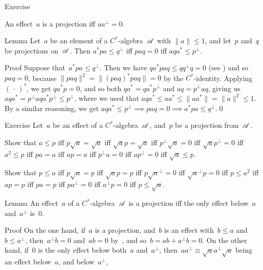 \documentclass[a]{subfiles}
\begin{document}
\begin{parsec}
\begin{point}{Exercise}
\begin{enumerate}
An effect~$a$ is a projection iff $aa^\perp=0$.
\end{enumerate}
\end{point}
\begin{point}[ad-contraposed]{Lemma}%
Let~$a$ be an element of a $C^*$-algebra~$\mathscr{A}$
with $\|a\|\leq 1$,
and let~$p$ and~$q$ be projections on~$\mathscr{A}$.
Then 
$a^* p a \leq q^\perp$
iff $paq=0$
iff  $aqa^*\leq p^\perp$.
\begin{point}{Proof}%
Suppose that~$a^*pa\leq q^\perp$.
Then we have $q a^*pa q \leq qq^\perp q = 0$
(see )
and so $paq=0$,
because $\|paq\|^2=\|(paq)^*paq\|=0$
by the $C^*$-identity.
Applying $(\,\cdot\,)^*$,
we get $qa^*p=0$, and so both $qa^* = qa^*p^\perp$
and $aq = p^\perp aq$, giving
us $aqa^* = p^\perp a q a^* p^\perp 
\leq p^\perp$,
where we used that $aqa^*\leq aa^*\leq \|aa^*\|=\|a\|^2\leq 1$.
By a similar reasoning,
we get $aqa^*\leq p^\perp \implies paq=0\implies a^*pa\leq q^\perp$.\qed
\end{point}
\end{point}
\begin{point}{Exercise}%
Let~$a$ be an effect of a $C^*$-algebra~$\mathscr{A}$,
and~$p$ be a projection from~$\mathscr{A}$.
\begin{point}%
Show that $a\leq p$
iff $p\sqrt{a} = \sqrt{a}$
iff $\sqrt{a}p = \sqrt{a}$
iff $p^\perp\sqrt{a} = 0$
iff $\sqrt{a}p^\perp = 0$
iff $a^2\leq p$
iff $p a  = a$
iff $ a p = a $
iff $p^\perp a  = 0$
iff $ap^\perp = 0$
iff $\sqrt{a}\leq p$.
\end{point}
\begin{point}%
Show that $p\leq a$
iff $p \sqrt{a} = p$
iff $\sqrt{a} p = p$
iff $ p\sqrt{a}^\perp = 0$
iff $\sqrt{a}^\perp p = 0$
iff $p\leq a^2$
iff $ap=p$
iff $pa = p$
iff $pa^\perp =0$
iff $a^\perp p =0$
iff $p\leq \sqrt{a}$.
\end{point}
\end{point}
\begin{point}{Lemma}%
An effect~$a$ of a $C^*$-algebra~$\mathscr{A}$
is a projection iff the only effect
below~$a$ and~$a^\perp$ is~$0$.
\begin{point}{Proof}%
On the one hand,
if~$a$ is a projection,
and~$b$ is an effect with~$b\leq a$
and~$b\leq a^\perp$,
then~$a^\perp b=0$ and~$ab=0$ by~,
and so~$b=ab+a^\perp b = 0$.
On the other hand,
if~$0$ is the only effect below both~$a$ and~$a^\perp$,
then~$aa^\perp\equiv \sqrt{a}a^\perp \sqrt{a}$
being an effect below~$a$, and below~$a^\perp$,

\end{point}
\end{point}
\end{parsec}
\end{document}
